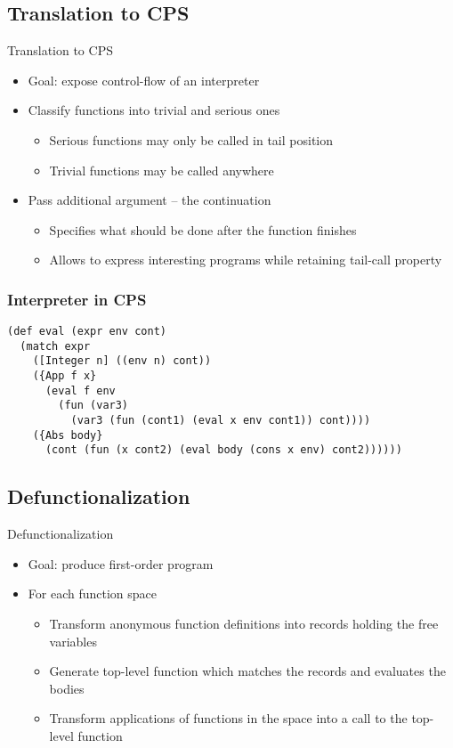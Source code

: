 \documentclass{beamer}
\begin{document}
\subsection{Translation to CPS}

\begin{frame}{Translation to CPS}
  \begin{itemize}
    \item Goal: expose control-flow of an interpreter
    \item Classify functions into trivial and serious ones
    \begin{itemize}
      \item Serious functions may only be called in tail position
      \item Trivial functions may be called anywhere
    \end{itemize}
    \pause
    \item Pass additional argument -- the continuation
    \begin{itemize}
      \item Specifies what should be done after the function finishes
      \item Allows to express interesting programs while retaining tail-call property
    \end{itemize}
  \end{itemize}
\end{frame}

\begin{frame}[fragile]
  \frametitle{Interpreter in CPS}
  \begin{lstlisting}
(def eval (expr env cont)
  (match expr
    ([Integer n] ((env n) cont))
    ({App f x}
      (eval f env
        (fun (var3)
          (var3 (fun (cont1) (eval x env cont1)) cont))))
    ({Abs body}
      (cont (fun (x cont2) (eval body (cons x env) cont2))))))
  \end{lstlisting}
\end{frame}

\subsection{Defunctionalization}

\begin{frame}{Defunctionalization}
  \begin{itemize}
    \item Goal: produce first-order program
    \item For each function space
    \begin{itemize}
      \item Transform anonymous function definitions into records holding the free variables
      \item Generate top-level function which matches the records and evaluates the bodies
      \item Transform applications of functions in the space into a call to the top-level function
    \end{itemize}
  \end{itemize}
\end{frame}
\end{document}

